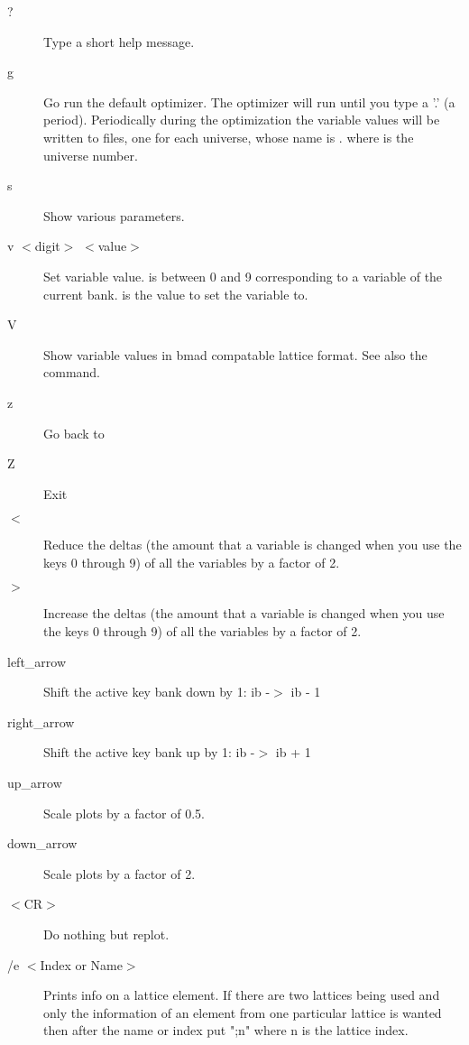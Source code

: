 \begin{description}
\item[?]
Type a short help message.

\item[g]
Go run the default optimizer. The optimizer will run until you type a
'.' (a period).  Periodically during the optimization the variable
values will be written to files, one for each universe, whose name is
. where \vn{\#} is the universe number.

\item[s]  
Show various parameters.

\item[v $<$digit$>$ $<$value$>$]
Set variable value.  is between 0 and 9 corresponding to a
variable of the current bank.  is the value to set the
variable to.

\item[V]
Show variable values in bmad compatable lattice format. See also the
 command.

\item[z] 
Go back to 

\item[Z] 
Exit \tao
                                        
\item[$<$]
Reduce the deltas (the amount that a variable is changed when you use
the keys 0 through 9) of all the variables by a factor of 2.

\item[$>$]
Increase the deltas (the amount that a variable is changed when you
use the keys 0 through 9) of all the variables by a factor of 2.

\item[left\_arrow]
Shift the active key bank down by 1: ib -$>$ ib - 1

\item[right\_arrow]
Shift the active key bank up by 1: ib -$>$ ib + 1

\item[up\_arrow]
Scale plots by a factor of 0.5.

\item[down\_arrow]
Scale plots by a factor of 2.

\item[$<$CR$>$]
Do nothing but replot.

\item[/e $<$Index or Name$>$]
Prints info on a lattice element. If there are two lattices being used
and only the information of an element from one particular lattice is
wanted then after the name or index put ";n" where n is the lattice
index.


\end{description}
